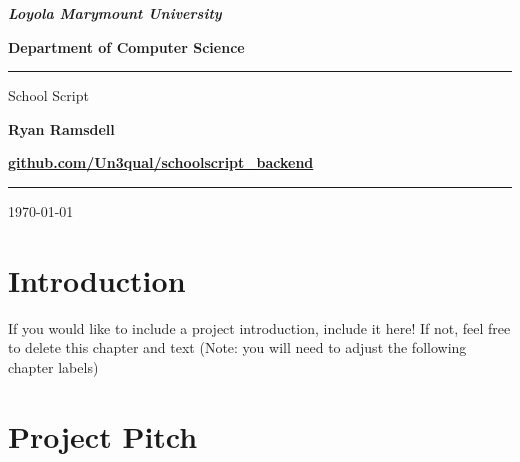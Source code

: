 \documentclass[12pt, a4paper,oneside]{book}
\numberwithin{equation}{section}
\newcommand{\MyName}{Ryan Ramsdell} %
\newcommand{\MyLink}{\url{github.com/Un3qual/schoolscript_backend}} %
\newcommand{\ProjectTitle}{School Script} %
\newcommand{\SuperviserName}{Insert Supervisor's name }  %
\begin{document}
\thispagestyle{empty}

\begin{center}
{\LARGE \bf \sl Loyola Marymount University}

{\LARGE \bf Department of Computer Science}

\noindent\textcolor{mycrimson}{\rule{\linewidth}{4.8pt}}

\vspace{2.5cm}
{\LARGE{\color{myblue}  \ProjectTitle{}}}

\vspace{1.5cm}

{\Large \bf \MyName{}}

\vspace{11cm} %


{\color{myblue} \bf \MyLink{}}

\vspace{2cm}


\vspace{.25cm}
\noindent\textcolor{mycrimson}{\rule{\linewidth}{4.8pt}}
\vspace{1cm}
{\Large \today }\\[4pt] %


\end{center}


\newpage

\tableofcontents


\chapter{Introduction}\label{ch:1}

If you would like to include a project introduction, include it here! If not, feel free to delete this chapter and text (Note: you will need to adjust the following chapter labels)


\chapter{Project Pitch}\label{ch:2}
\end{document}
